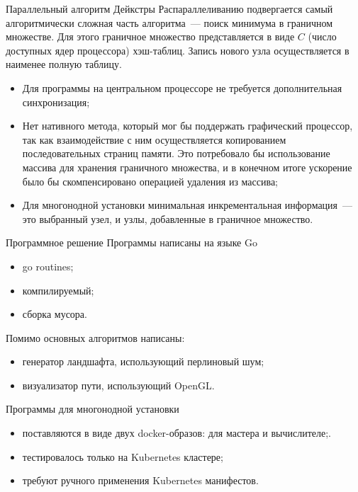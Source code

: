     \begin{frame}[t]{Параллельный алгоритм Дейкстры}
        Распараллеливанию подвергается самый алгоритмически сложная часть алгоритма~--- поиск минимума в граничном множестве. Для этого граничное множество представляется в виде $C$ (число доступных ядер процессора) хэш-таблиц. Запись нового узла осуществляется в наименее полную таблицу.

        \begin{itemize}
            \item Для программы на центральном процессоре не требуется дополнительная синхронизация;
            \item Нет нативного метода, который мог бы поддержать графический процессор, так как взаимодействие с ним осуществляется копированием последовательных страниц памяти. Это потребовало бы использование массива для хранения граничного множества, и в конечном итоге ускорение было бы скомпенсировано операцией удаления из массива;
            \item Для многонодной установки минимальная инкрементальная информация~--- это выбранный узел, и узлы, добавленные в граничное множество.
        \end{itemize}
    \end{frame}
    \begin{frame}[t]{Программное решение}
        Программы написаны на языке Go
        \begin{itemize}
            \item go routines;
            \item компилируемый;
            \item сборка мусора.
        \end{itemize}
        Помимо основных алгоритмов написаны:
        \begin{itemize}
            \item генератор ландшафта, использующий перлиновый шум;
            \item визуализатор пути, использующий OpenGL.
        \end{itemize}
        Программы для многонодной установки
        \begin{itemize}
            \item поставляются в виде двух docker-образов: для мастера и вычислителе;.
            \item тестировалось только на Kubernetes кластере;
            \item требуют ручного применения Kubernetes манифестов.
        \end{itemize}
    \end{frame}
